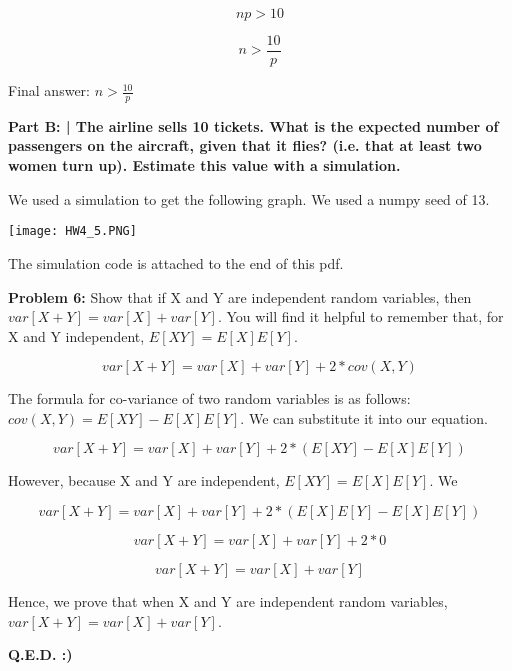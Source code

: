\documentclass{article}
\begin{document}
 \begin{displaymath}
    np > 10
 \end{displaymath}
 
 \begin{displaymath}
    n > \frac{10}{p}
 \end{displaymath}
 
 Final answer: $n>\frac{10}{p}$\newline
 
 \textbf{Part B: | The airline sells 10 tickets. What is the expected number of passengers on the aircraft, given that it flies? (i.e. that at least two women turn up). Estimate this value with a simulation.}\newline
 
 We used a simulation to get the following graph. We used a numpy seed of 13.\newline
 
 \texttt{[image: HW4\_5.PNG]}
 
 The simulation code is attached to the end of this pdf.\newline
 
 \newpage
 
 \begin{center}
     \Large\textbf{Problem 6:} Show that if X and Y are independent random variables, then $var[X+Y] = var[X] + var[Y]$. You will find it helpful to remember that, for X and Y independent, $E[XY] = E[X]E[Y]$.\par
 \end{center}
 
 \begin{equation}
    var[X+Y] = var[X] + var[Y] + 2*cov(X,Y)
 \end{equation}
 
 The formula for co-variance of two random variables is as follows: $cov(X,Y)=E[XY]-E[X]E[Y]$. We can substitute it into our equation.
 
 \begin{equation}
    var[X+Y] = var[X] + var[Y] + 2*(E[XY]-E[X]E[Y])
 \end{equation}
 
 However, because X and Y are independent, $E[XY]=E[X]E[Y]$. We 
 
 \begin{equation}
    var[X+Y] = var[X] + var[Y] + 2*(E[X]E[Y]-E[X]E[Y])
 \end{equation}
 
 \begin{equation}
    var[X+Y] = var[X] + var[Y] + 2*0
 \end{equation}
 
 \begin{equation}
    var[X+Y] = var[X] + var[Y]
 \end{equation}
 
 Hence, we prove that when X and Y are independent random variables, $var[X+Y]=var[X]+var[Y]$.
 
 \begin{center}
      \Large\textbf{Q.E.D. :)}
 \end{center}
 
 
\end{document}
